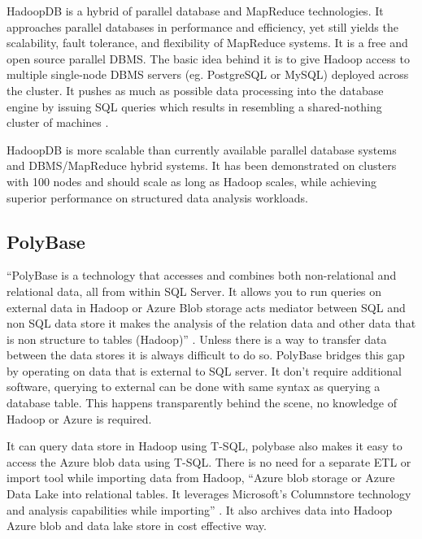      HadoopDB is a hybrid of parallel database and MapReduce
     technologies. It approaches parallel databases in performance and
     efficiency, yet still yields the scalability, fault tolerance,
     and flexibility of MapReduce systems. It is a free and open
     source parallel DBMS. The basic idea behind it is to give Hadoop
     access to multiple single-node DBMS servers (eg. PostgreSQL or
     MySQL) deployed across the cluster. It pushes as much as possible
     data processing into the database engine by issuing SQL queries
     which results in resembling a shared-nothing cluster of
     machines \cite{www-hadoopdb}.

     HadoopDB is more scalable than currently available parallel
     database systems and DBMS/MapReduce hybrid systems. It has been
     demonstrated on clusters with 100 nodes and should scale as long
     as Hadoop scales, while achieving superior performance on
     structured data analysis workloads.
     
\subsection{PolyBase}

     ``PolyBase is a technology that accesses and combines both non-relational
     and relational data, all from within SQL Server. It allows you to run 
     queries on external data in Hadoop or Azure Blob storage acts 
     mediator between SQL and non SQL data store it makes the analysis 
     of the relation data and other data that is non structure to 
     tables (Hadoop)'' \cite{www-polybase}. Unless there is a way to
     transfer data between the data stores it is always difficult to do so. 
     PolyBase bridges this gap by operating on data that is external 
     to SQL server. It don’t require additional software, querying to 
     external can be done with same syntax as querying a database table. 
     This happens transparently behind the scene, no knowledge of Hadoop
     or Azure is required.

     It can query data store in Hadoop using T-SQL, polybase also makes 
     it easy to access the Azure blob data using T-SQL. There is no 
     need for a separate ETL or import tool while importing data 
     from Hadoop, ``Azure blob storage or Azure Data Lake into relational 
     tables. It leverages Microsoft’s Columnstore technology and analysis 
     capabilities while importing'' \cite{www-polybase}. It also archives 
     data into Hadoop Azure blob and data lake store in cost effective way. 

